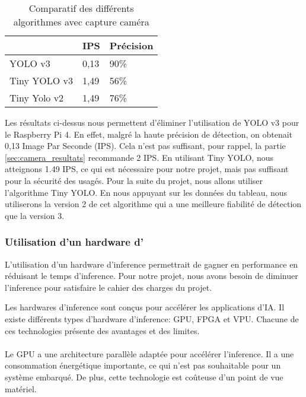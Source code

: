 \begin{table}[ht!]
    \centering
    \begin{tabular}{|l|l|l|}
    \hline
                 & IPS  & Précision \\ \hline
    YOLO v3      & 0,13 & 90\%      \\ \hline
    Tiny YOLO v3 & 1,49 & 56\%      \\ \hline
    Tiny Yolo v2 & 1,49 & 76\%      \\ \hline
    \end{tabular}
    \caption{Comparatif des différents algorithmes avec capture caméra}
    \label{fig:comparatifAlgoAvecCam}
    \end{table}

Les résultats ci-dessus nous permettent d'éliminer l'utilisation de YOLO v3 pour le Raspberry Pi 4. 
En effet, malgré la haute précision de détection, on obtenait 0,13 Image Par Seconde (IPS). 
Cela n'est pas suffisant, pour rappel, la partie \ref{sec:camera_resultats} recommande 2 IPS.
En utilisant Tiny YOLO, nous atteignons 1.49 IPS, ce qui est nécessaire pour notre projet, mais pas suffisant pour la sécurité des usagés.
Pour la suite du projet, nous allons utiliser l'algorithme Tiny YOLO. 
En nous appuyant sur les données du tableau, nous utiliserons la version 2 de cet algorithme qui a une meilleure fiabilité de détection que la version 3.

\subsubsection{Utilisation d'un hardware d'}
\label{sec:hwInference_hwinf}
L'utilisation d'un hardware d'\gls{inference} permettrait de gagner en performance en réduisant le temps d'\gls{inference}.
Pour notre projet, nous avons besoin de diminuer l'\gls{inference} pour satisfaire le cahier des charges du projet.

Les hardwares d'\gls{inference} sont conçus pour accélérer les applications d'\gls{IA}.
Il existe différents types d'hardware d'\gls{inference}: \gls{GPU}, \gls{FPGA} et \gls{VPU}. 
Chacune de ces technologies présente des avantages et des limites.

\paragraph{}
\label{sec:GPU_hwInf}
Le \gls{GPU} a une architecture parallèle adaptée pour accélérer l'\gls{inference}. 
Il a une consommation énergétique importante, ce qui n'est pas souhaitable pour un système embarqué. 
De plus, cette technologie est coûteuse d'un point de vue matériel.

